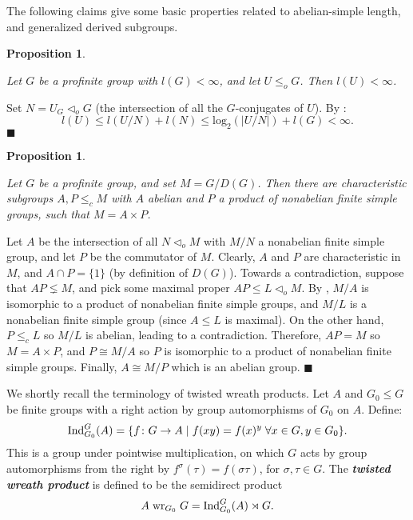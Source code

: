 \documentclass[12pt,a4paper]{article}
\newtheorem{proposition}[theorem]{Proposition}
\newenvironment{proof}[1][Proof]{\begin{trivlist}
\item[\hskip \labelsep {\bfseries #1}]}{\end{trivlist}}
\begin{document}
The following claims give some basic properties related to abelian-simple length, and generalized derived subgroups.  

\begin{proposition} \label{FinLindexProp}

Let $G$ be a profinite group with $l(G) < \infty$, and let $U \leq_o G$. Then $l(U) < \infty$.

\end{proposition}

\begin{proof}

Set $N = U_G \lhd_o G$ (the intersection of all the $G$-conjugates of $U$). By \cite[Proposition 2.9, Lemma 2.2, Lemma 2.7 (2)]{BFW}: $$l(U) \leq l(U/N) + l(N) \leq \text{log}_2(|U/N|) + l(G) < \infty.$$ $\blacksquare$

\end{proof}

\begin{proposition} \label{abnonabProp}

Let $G$ be a profinite group, and set $M = G/D(G)$. Then there are characteristic subgroups $A,P \leq_c M$ with $A$ abelian and $P$ a product of nonabelian finite simple groups, such that $M = A \times P$.

\end{proposition}

\begin{proof}

Let $A$ be the intersection of all $N \lhd_o M$ with $M/N$ a nonabelian finite simple group, and let $P$ be the commutator of $M$. Clearly, $A$ and $P$ are characteristic in $M$, and $A \cap P = \{1\}$ (by definition of $D(G)$). Towards a contradiction, suppose that $AP \lneq M$, and pick some maximal proper $AP \leq L \lhd_o M$. By \cite[Lemma 18.3.11]{FJ}, $M/A$ is isomorphic to a product of nonabelian finite simple groups, and $M/L$ is a nonabelian finite simple group (since $A \leq L$ is maximal). On the other hand, $P \leq_c L$ so $M/L$ is abelian, leading to a contradiction. Therefore, $AP = M$ so $M = A \times P$, and $P \cong M/A$ so $P$ is isomorphic to a product of nonabelian finite simple groups. Finally, $A \cong M/P$ which is an abelian group. $\blacksquare$

\end{proof}

We shortly recall the terminology of twisted wreath products. Let $A$ and $G_0 \leq G$ be finite groups with a right action by group automorphisms of $G_0$ on $A$. Define: $$\text{Ind}_{G_0}^{G}(A) = \{f \colon G \rightarrow A \hspace{1mm} | \hspace{1mm} f(xy) = f(x)^y \hspace{1mm} \forall x \in G, y \in G_0 \}.$$ This is a group under pointwise multiplication, on which $G$ acts by group automorphisms from the right by $f^{\sigma}(\tau) = f(\sigma\tau)$,  for $\sigma, \tau \in G$. The \textbf{\textit{twisted wreath product}} is defined
to be the semidirect product $$A \hspace{1mm} \text{wr}_{G_0} \hspace{1mm} G = \text{Ind}_{G_0}^{G}(A) \rtimes G.$$
\end{document}
